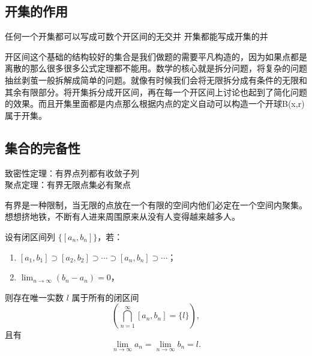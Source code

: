 \documentclass[lang=cn,10pt]{elegantbook}
\begin{document}
\subsection{开集的作用}

\begin{proposition}
    任何一个开集都可以写成可数个开区间的无交并
    开集都能写成开集的并
\end{proposition}
开区间这个基础的结构较好的集合是我们做题的需要平凡构造的，因为如果点都是离散的那么很多很多公式定理都不能用。数学的核心就是拆分问题，将复杂的问题抽丝剥茧一般拆解成简单的问题。就像有时候我们会将无限拆分成有条件的无限和其余有限部分。将开集拆分成开区间，再在每一个开区间上讨论也起到了简化问题的效果。而且开集里面都是内点那么根据内点的定义自动可以构造一个开球B(x,r)属于开集。



\subsection{集合的完备性}
\begin{theorem}
    致密性定理：有界点列都有收敛子列\\
    聚点定理：有界无限点集必有聚点
\end{theorem}
有界是一种限制，当无限的点放在一个有限的空间内他们必定在一个空间内聚集。想想挤地铁，不断有人进来周围原来从没有人变得越来越多人。
\begin{theorem}[闭区间套定理]{}
设有闭区间列 $\{[a_n, b_n]\}$，若：

\begin{enumerate}
  \item $[a_1, b_1] \supset [a_2, b_2] \supset \cdots \supset [a_n, b_n] \supset \cdots$；
  \item $\displaystyle \lim_{n \to \infty} (b_n - a_n) = 0$，
\end{enumerate}

则存在唯一实数 $l$ 属于所有的闭区间
\[
\left( \bigcap_{n=1}^\infty [a_n, b_n] = \{l\} \right),
\]
且有
\[
\lim_{n \to \infty} a_n = \lim_{n \to \infty} b_n = l.
\]
\end{theorem}
\end{document}
